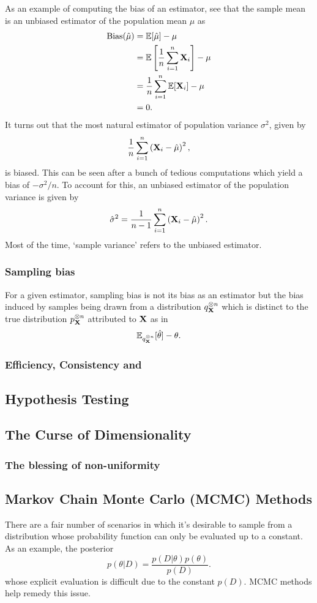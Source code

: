 \documentclass[11pt]{article}
\begin{document}
\begin{appendices}
As an example of computing the bias of an estimator, see that the sample mean is an unbiased estimator of the population mean $\mu$ as
\begin{align*}
    \text{Bias}(\hat{\mu})
    &=
    \mathbb{E}[\hat{\mu}]-\mu\\
    &=
    \mathbb{E}\left[\frac{1}{n}\sum_{i=1}^n\mathbf{X}_i\right]-\mu\\
    &=
    \frac{1}{n}\sum_{i=1}^n\mathbb{E}[\mathbf{X}_i]-\mu\\
    &=
    0.
\end{align*}
It turns out that the most natural estimator of population variance $\sigma^2$, given by
$$
\frac{1}{n}\sum_{i=1}^n\left(\mathbf{X}_i-\hat{\mu}\right)^2,
$$
is biased. This can be seen after a bunch of tedious computations which yield a bias of $-\sigma^2/n$. To account for this, an unbiased estimator of the population variance is given by
$$
\hat{\sigma}^2
=
\frac{1}{n-1}\sum_{i=1}^n\left(\mathbf{X}_i-\hat{\mu}\right)^2.
$$
Most of the time, `sample variance' refers to the unbiased estimator.

\subsubsection{Sampling bias}
For a given estimator, sampling bias is not its bias as an estimator but the bias induced by samples being drawn from a distribution $q_{\mathbf{X}}^{\otimes n}$ which is distinct to the true distribution $p_{\mathbf{X}}^{\otimes n}$ attributed to $\mathbf{X}$ as in
$$
\mathbb{E}_{q_{\mathbf{X}}^{\otimes n}}[\hat{\theta}]-\theta.
$$

\subsubsection{Efficiency, Consistency and }

\subsection{\TODO Hypothesis Testing}

\subsection{\TODO The Curse of Dimensionality}

\subsubsection*{The blessing of non-uniformity}

\subsection{\TODO Markov Chain Monte Carlo (MCMC) Methods}
There are a fair number of scenarios in which it's desirable to sample from a distribution whose probability function can only be evaluated up to a constant. As an example, the posterior
$$
p(\theta|D)
=
\frac{p(D|\theta)p(\theta)}{p(D)}.
$$
whose explicit evaluation is difficult due to the constant $p(D)$. MCMC methods help remedy this issue.


\end{appendices}
\end{document}

